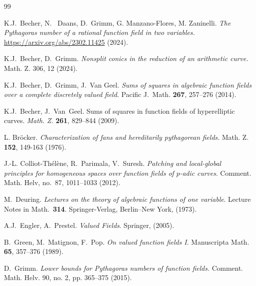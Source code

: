 \begin{thebibliography}{99}

 K.J.~Becher, N.~ Daans, D.~Grimm, G. Manzano-Flores, M. Zaninelli. \textit{The Pythagoras number of a rational function field in two variables.}
\url{https://arxiv.org/abs/2302.11425} (2024).

 K.J.~Becher, D.~Grimm. \textit{Nonsplit conics in the reduction of an arithmetic curve.} Math. Z. 306, 12 (2024).

K.J.~Becher, D.~Grimm, J.~Van Geel. \textit{Sums of squares in algebraic function fields over a complete discretely valued field.} Pacific J.~Math. {\bf 267}, 257--276 (2014).






 

 K.J.~Becher, J.~Van~Geel.
{Sums of squares in function fields of hyperelliptic curves}. \textit{Math. Z.} {\bf 261}, 829--844 (2009).



L. Br\"ocker. \textit{Characterization of fans and hereditarily pythagorean fields.} Math. Z. \textbf{152}, 149-163 (1976).

J.-L. Colliot-Th\'el\`ene, R.~Parimala, V.~Suresh. \textit{Patching and
  local-global principles for homogeneous spaces over function fields of
  $p$-adic curves}. Comment. Math. Helv, no.~87, 1011--1033 (2012).


   M.~Deuring.
\textit{Lectures on the theory of algebraic functions of one variable}. Lecture
Notes in Math.~{\bf 314}. Springer-Verlag, Berlin--New York, (1973). 



 A.J.~Engler, A.~Prestel. \textit{Valued Fields}. Springer, (2005).

B.~Green, M.~Matignon, F.~Pop. \textit{On valued function fields {I}.} Manuscripta Math. {\bf 65}, 357--376 (1989).


D.~Grimm. \textit{Lower bounds for Pythagoras numbers of function fields.} Comment. Math. Helv.
90, no. 2, pp. 365--375 (2015).



\end{thebibliography}
